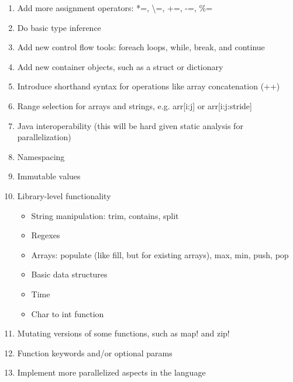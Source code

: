 \begin{enumerate}
\item
Add more assignment operators: *=, \textbackslash=, +=, -=, \%=
\item
Do basic type inference
\item
Add new control flow tools: foreach loops, while, break, and continue
\item
Add new container objects, such as a struct or dictionary
\item
Introduce shorthand syntax for operations like array concatenation (++)
\item
Range selection for arrays and strings, e.g. arr[i:j] or arr[i:j:stride]
\item
Java interoperability (this will be hard given static analysis for parallelization)
\item
Namespacing
\item
Immutable values
\item
Library-level functionality
\begin{itemize}
\item
String manipulation: trim, contains, split
\item
Regexes
\item
Arrays: populate (like fill, but for existing arrays), max, min, push, pop
\item
Basic data structures
\item
Time
\item
Char to int function
\end{itemize}
\item
Mutating versions of some functions, such as map! and zip!
\item
Function keywords and/or optional params
\item
Implement more parallelized aspects in the language
\end{enumerate}

